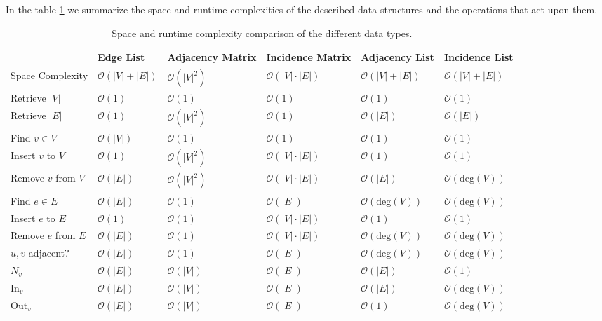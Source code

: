             In the table \ref{sumtabds} we summarize the space and runtime complexities of the described data structures and the operations that act upon them. 
            
            \begin{table}
                \begin{tabular}[c]{p{3cm} p{2cm} p{2cm} p{2cm} p{2cm} p{2cm}} \toprule
                & Edge List & Adjacency Matrix & Incidence Matrix & Adjacency List & Incidence List \\ \midrule
                Space Complexity & $\mathcal{O}(|V| + |E|)$ & $\mathcal{O}(|V|^2)$ & $\mathcal{O}(|V| \cdot |E|)$ & $\mathcal{O}(|V| + |E|)$ & $\mathcal{O}(|V| + |E|)$ \\
                Retrieve $|V|$ & $\mathcal{O}(1)$ & $\mathcal{O}(1)$ & $\mathcal{O}(1)$ & $\mathcal{O}(1)$ & $\mathcal{O}(1)$ \\
                Retrieve $|E|$ & $\mathcal{O}(1)$ & $\mathcal{O}(|V|^2)$ & $\mathcal{O}(1)$ & $\mathcal{O}(|E|)$ & $\mathcal{O}(|E|)$ \\
                Find $v \in V$ & $\mathcal{O}(|V|)$ & $\mathcal{O}(1)$ & $\mathcal{O}(1)$ & $\mathcal{O}(1)$ & $\mathcal{O}(1)$ \\
                Insert $v$ to $V$ & $\mathcal{O}(1)$ & $\mathcal{O}(|V|^2)$ & $\mathcal{O}(|V| \cdot |E|)$ & $\mathcal{O}(1)$ & $\mathcal{O}(1)$ \\
                Remove $v$ from $V$ & $\mathcal{O}(|E|)$ & $\mathcal{O}(|V|^2)$ & $\mathcal{O}(|V| \cdot |E|)$ & $\mathcal{O}(|E|)$ & $\mathcal{O}(\text{deg}(V))$ \\
                Find $e \in E$ & $\mathcal{O}(|E|)$ & $\mathcal{O}(1)$ & $\mathcal{O}(|E|)$ & $\mathcal{O}(\text{deg}(V))$ & $\mathcal{O}(\text{deg}(V))$ \\
                Insert $e$ to $E$ & $\mathcal{O}(1)$ & $\mathcal{O}(1)$ & $\mathcal{O}(|V| \cdot |E|)$ & $\mathcal{O}(1)$ & $\mathcal{O}(1)$ \\
                Remove $e$ from $E$ & $\mathcal{O}(|E|)$ & $\mathcal{O}(1)$ & $\mathcal{O}(|V| \cdot |E|)$ & $\mathcal{O}(\text{deg}(V))$ & $\mathcal{O}(\text{deg}(V))$ \\
                $u, v$ adjacent? & $\mathcal{O}(|E|)$ & $\mathcal{O}(1)$ & $\mathcal{O}(|E|)$ & $\mathcal{O}(\text{deg}(V))$ & $\mathcal{O}(\text{deg}(V))$ \\
                $N_v$ & $\mathcal{O}(|E|)$ & $\mathcal{O}(|V|)$ & $\mathcal{O}(|E|)$ & $\mathcal{O}(|E|)$ & $\mathcal{O}(1)$ \\
                $\text{In}_v$ & $\mathcal{O}(|E|)$ & $\mathcal{O}(|V|)$ & $\mathcal{O}(|E|)$ & $\mathcal{O}(|E|)$ & $\mathcal{O}(\text{deg}(V))$ \\
                $\text{Out}_v$ & $\mathcal{O}(|E|)$ & $\mathcal{O}(|V|)$ & $\mathcal{O}(|E|)$ & $\mathcal{O}(1)$ & $\mathcal{O}(\text{deg}(V))$ \\ \bottomrule
            \end{tabular}
            \caption{Space and runtime complexity comparison of the different data types.}
            \label{sumtabds}
            \end{table}

